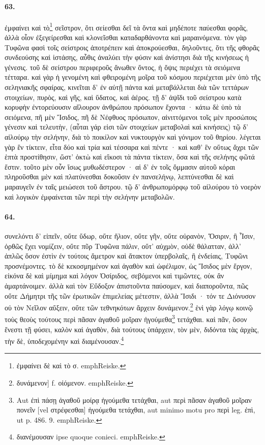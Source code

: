 \documentclass[a4paper, 11pt, oneside, polutonikogreek, german]{article}
\begin{document}
\paragraph{63.}
ἐμφαίνει καὶ τὸ\footnote{ἐμφαίνει δὲ καὶ τὸ σ. emph{Reiske.}} σεῖστρον, ὅτι σείεσθαι δεῖ τὰ ὄντα καὶ μηδέποτε παύεσθαι φορᾶς, ἀλλὰ οἷον ἐξεγείρεσθαι καὶ κλονεῖσθαι καταδαρθάνοντα καὶ μαραινόμενα. τὸν γὰρ Τυφῶνα φασὶ τοῖς σείστροις ἀποτρέπειν καὶ ἀποκρούεσθαι, δηλοῦντες, ὅτι τῆς φθορᾶς συνδεούσης καὶ ἱστάσης, αὖθις ἀναλύει τὴν φύσιν καὶ ἀνίστησι διὰ τῆς κινήσεως ἡ γένεσις. τοῦ δὲ σείστρου περιφεροῦς ἄνωθεν ὄντος, ἡ ὄψις περιέχει τὰ σειόμενα τέτταρα. καὶ γὰρ ἡ γενομένη καὶ φθειρομένη μοῖρα τοῦ κόσμου περιέχεται μὲν ὑπὸ τῆς σεληνιακῆς σφαίρας, κινεῖται δ' ἐν αὐτῇ πάντα καὶ μεταβάλλεται διὰ τῶν τεττάρων στοιχείων, πυρὸς, καὶ γῆς, καὶ ὕδατος, καὶ ἀέρος. τῇ δ' ἀψῖδι τοῦ σείστρου κατὰ κορυφὴν ἐντορεύουσιν αἴλουρον ἀνθρώπου πρόσωπον ἔχοντα · κάτω δὲ ὑπὸ τὰ σειόμενα, πῆ μὲν Ἴσιδος, πῆ δὲ Νέφθυος πρόσωπον, αἰνιττόμενοι τοῖς μὲν προσώποις γένεσιν καὶ τελευτὴν, (αὗται γάρ εἰσι τῶν στοιχείων μεταβολαὶ καὶ κινήσεις) τῷ δ' αἰλούρῳ τὴν σελήνην, διὰ τὸ ποικίλον καὶ νυκτουργὸν καὶ γόνιμον τοῦ θηρίου. λέγεται γὰρ ἓν τίκτειν, εἶτα δύο καὶ τρία καὶ τέσσαρα καὶ πέντε · καὶ καθ' ἓν οὕτως ἄχρι τῶν ἑπτὰ προστίθησιν, ὥστ' ὀκτὼ καὶ εἴκοσι τὰ πάντα τίκτειν, ὅσα καὶ τῆς σελήνης φῶτά ἔστιν. τοῦτο μὲν οὖν ἴσως μυθωδέστερον · αἱ δ' ἐν τοῖς ὄμμασιν αὐτοῦ κόραι πληροῦσθαι μὲν καὶ πλατύνεσθαι δοκοῦσιν ἐν πανσελήνῳ, λεπτύνεσθαι δὲ καὶ μαραυγεῖν ἐν ταῖς μειώσεσι τοῦ ἄστρου. τῷ δ' ἀνθρωπομόρφῳ τοῦ αἰλούρου τὸ νοερὸν καὶ λογικὸν ἐμφαίνεται τῶν περὶ τὴν σελήνην μεταβολῶν.

\paragraph{64.}
συνελόντι δ' εἰπεῖν, οὔτε ὕδωρ, οὔτε ἥλιον, οὔτε γῆν, οὔτε οὐρανὸν, Ὄσιριν, ἢ Ἶσιν, ὀρθῶς ἔχει νομίζειν, οὔτε πῦρ Τυφῶνα πάλιν, οὔτ' αὐχμὸν, οὐδὲ θάλατταν, ἀλλ' ἁπλῶς ὅσον ἐστὶν ἐν τούτοις ἄμετρον καὶ ἄτακτον ὑπερβολαῖς, ἢ ἐνδείαις, Τυφῶνι προσνέμοντες. τὸ δὲ κεκοσμημένον καὶ ἀγαθὸν καὶ ὠφέλιμον, ὡς Ἴσιδος μὲν ἔργον, εἰκόνα δὲ καὶ μίμημα καὶ λόγον Ὀσίριδος, σεβόμενοι καὶ τιμῶντες, οὐκ ἂν ἁμαρτάνοιμεν. ἀλλὰ καὶ τὸν Εὔδοξον ἀπιστοῦντα παύσομεν, καὶ διαποροῦντα, πῶς οὔτε Δήμητρι τῆς τῶν ἐρωτικῶν ἐπιμελείας μέτεστιν, ἀλλὰ Ἴσιδι · τόν τε Διόνυσον οὐ τὸν Νεῖλον αὔξειν, οὔτε τῶν τεθνηκότων ἄρχειν δυνάμενον.\footnote{δυνάμενον] f. οἰόμενον. emph{Reiske.}} ἑνὶ γὰρ λόγῳ κοινῷ τοὺς θεοὺς τούτους περὶ πᾶσαν ἀγαθοῦ μοῖραν ἡγούμεθα\footnote{Aut ἐπὶ πάσῃ ἀγαθοῦ μοίρᾳ ἡγούμεθα τετάχθαι, aut περὶ πᾶσαν ἀγαθοῦ μοῖραν πονεῖν [vel στρέφεσθαι] ἡγούμεθα τετάχθαι, aut minimo motu pro περὶ leg. ἐπὶ, ut p. 486. 9. emph{Reiske.}} τετάχθαι. καὶ πᾶν, ὅσον ἔνεστι τῇ φύσει, καλὸν καὶ ἀγαθὸν, διὰ τούτους ὑπάρχειν, τὸν μὲν, διδόντα τὰς ἀρχὰς, τὴν δὲ, ὑποδεχομένην καὶ διαμένουσαν.\footnote{διανέμουσαν ipse quoque conieci. emph{Reiske.}}
\end{document}
